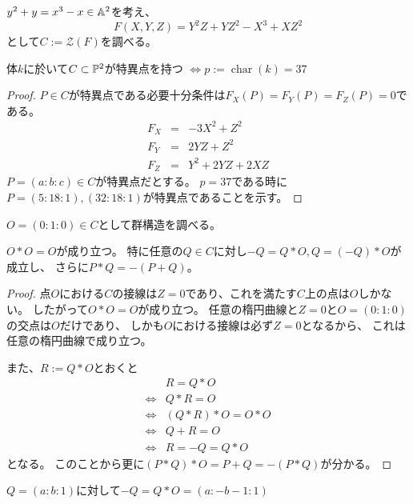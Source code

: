 \documentclass[a4paper]{jsarticle}
\begin{document}
        \begin{Example}
            $y^2+y=x^3-x \in \mathbb{A}^2$を考え、
            \[ F(X,Y,Z)=Y^2Z+YZ^2-X^3+XZ^2 \]として$C:=\mathcal{Z}(F)$を調べる。
            \begin{Lemma}
                体$k$に於いて$C \subset \mathbb{P}^2$が特異点を持つ $\iff p:=\operatorname{char}(k)=37$
            \end{Lemma}
            \begin{proof}
            $P \in C$が特異点である必要十分条件は$F_X(P)=F_Y(P)=F_Z(P)=0$である。
            \begin{eqnarray*}
                F_X&=&-3X^2+Z^2 \\
                F_Y&=&2YZ+Z^2 \\
                F_Z&=&Y^2+2YZ+2XZ
            \end{eqnarray*}
            $P=(a:b:c) \in C$が特異点だとする。
            $p=37$である時に$P=(5:18:1),(32:18:1)$が特異点であることを示す。
            \end{proof}

            $O=(0:1:0) \in C$として群構造を調べる。

            \begin{Lemma}
            $O \ast O=O$が成り立つ。
            特に任意の$Q \in C$に対し$-Q=Q \ast O, Q=(-Q) \ast O$が成立し、
            さらに$P \ast Q=-(P + Q)$。
            \end{Lemma}
            \begin{proof}
                点$O$における$C$の接線は$Z=0$であり、これを満たす$C$上の点は$O$しかない。
                したがって$O \ast O=O$が成り立つ。
                任意の楕円曲線と$Z=0$と$O=(0:1:0)$の交点は$O$だけであり、
                しかも$O$における接線は必ず$Z=0$となるから、
                これは任意の楕円曲線で成り立つ。
                
                また、$R:=Q \ast O$とおくと
                \begin{align*}
                    {}& R=Q \ast O \\
                    \iff& Q \ast R=O \\
                    \iff& (Q \ast R) \ast O=O \ast O \\
                    \iff& Q+R=O \\
                    \iff& R=-Q=Q \ast O
                \end{align*}
                となる。
                このことから更に$(P \ast Q) \ast O=P+Q=-(P \ast Q)$が分かる。
            \end{proof}

            \begin{Lemma}
                $Q=(a:b:1)$に対して$-Q=Q \ast O=(a:-b-1:1)$
            \end{Lemma}

        \end{Example}
\end{document}
